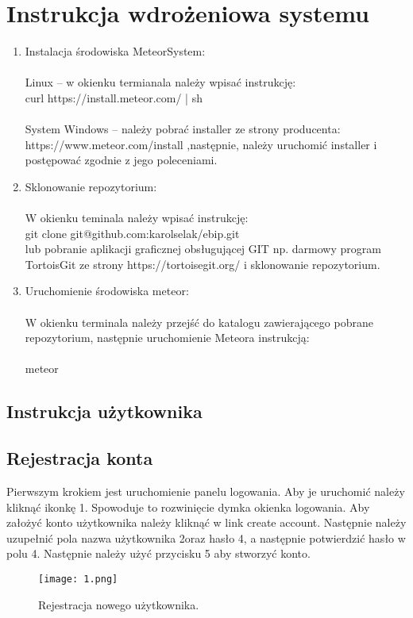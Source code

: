 \documentclass{article}
\begin{document}
\section{Instrukcja wdrożeniowa systemu}
	\begin{enumerate}
	\item Instalacja środowiska MeteorSystem:\\\\
	Linux – w okienku termianala należy wpisać instrukcję:\\ 
	curl https://install.meteor.com/ | sh\\\\
	System Windows – należy pobrać installer ze strony producenta:\\
	https://www.meteor.com/install ,następnie, należy uruchomić installer i postępować zgodnie z jego poleceniami.
	\item Sklonowanie repozytorium:\\\\
	W okienku teminala należy wpisać instrukcję:\\
	git clone git@github.com:karolselak/ebip.git\\
	lub pobranie aplikacji graficznej obsługującej GIT np. darmowy program TortoisGit ze strony https://tortoisegit.org/  i sklonowanie repozytorium.
	\item Uruchomienie środowiska meteor:\\\\
	W okienku terminala należy przejść do katalogu zawierającego pobrane repozytorium, następnie uruchomienie Meteora instrukcją:\\\\
	meteor
	
	\end{enumerate}
	

	\newpage
\subsection{Instrukcja użytkownika}
\subsection{Rejestracja konta}
	Pierwszym krokiem jest uruchomienie panelu logowania. Aby je uruchomić należy kliknąć ikonkę 1. Spowoduje to rozwinięcie dymka okienka logowania. Aby założyć konto użytkownika należy kliknąć w link create account. Następnie należy uzupełnić pola nazwa użytkownika 2oraz hasło 4, a następnie potwierdzić hasło w polu 4. Następnie należy użyć przycisku 5 aby stworzyć konto.
\begin{figure}[h!]
	\texttt{[image: 1.png]}
	\centering
	\caption{Rejestracja nowego użytkownika.}
\end{figure}	
\end{document}
